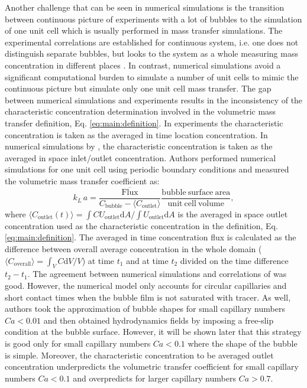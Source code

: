 \documentclass{article}
\newcommand{\vol}{k_L\,a}
\newcommand{\uoutlet}{U_{\mathrm{outlet}}}
\newcommand{\cbubble}{C_{\mathrm{bubble}}}
\newcommand{\coutlet}{C_{\mathrm{outlet}}}
\newcommand{\coverall}{C_{\mathrm{overall}}}
\begin{document}
Another challenge that can be seen in numerical simulations is the transition between continuous picture of experiments with a lot of bubbles to the simulation
of one unit cell which is usually performed in mass transfer simulations. The experimental correlations are established for continuous system, i.e. one does
not distinguish separate bubbles, but looks to the system as a whole measuring mass concentration
in different places \cite{bercic-mass}. In contrast, numerical simulations avoid a significant computational burden to simulate a number of unit cells 
to mimic the continuous picture but simulate only one unit cell mass transfer. The gap between numerical simulations and experiments results in the inconsistency of the characteristic concentration determination involved in
the volumetric mass transfer definition, Eq. \ref{eq:main:definition}. In experiments the characteristic concentration is taken as the averaged in time location concentration. 
In numerical simulations by \citet{vanbaten-circular}, the characteristic concentration is taken as the averaged in space inlet/outlet concentration. Authors \cite{vanbaten-circular} performed  numerical
simulations for one unit cell using periodic boundary conditions and measured the volumetric mass
transfer coefficient as:
\begin{equation}
\label{main:simulation:equation}
\vol=\frac{\mathrm{\overline{Flux}}}{\cbubble-\langle\coutlet\rangle} \frac{\mathrm{bubble\ surface\ area}}{\mathrm{unit\
cell\ volume}},
\end{equation}
where $\langle\coutlet(t)\rangle=\int{C \uoutlet \mathrm{d}A}/\int{\uoutlet\mathrm{d}A}$ is the averaged in space outlet concentration used as the characteristic concentration in the definition, Eq. \ref{eq:main:definition}. 
The averaged in time concentration flux is calculated as the difference between overall
average concentration in the whole domain ($\langle\coverall\rangle=\int_{V} C \mathrm{d}V /V$)
at time
$t_1$ and at time $t_2$ divided on the time difference $t_2-t_1$. The agreement between numerical
simulations \cite{vanbaten-circular} and correlations of \citet{bercic-mass} was good. However, the numerical model only
accounts for circular capillaries and short contact times when the
bubble film is not saturated with tracer. As well, authors took the
approximation of bubble shapes for small capillary numbers $Ca<0.01$ and then obtained
hydrodynamics fields by imposing a free-slip condition at the bubble surface. However, it will be shown later that this strategy is good only for small capillary numbers $Ca<0.1$
where the shape of the bubble is simple. Moreover, the characteristic concentration to be averaged outlet concentration underpredicts the volumetric transfer coefficient for small capillary
numbers $Ca<0.1$ and overpredicts for larger capillary numbers $Ca>0.7$.
\end{document}
